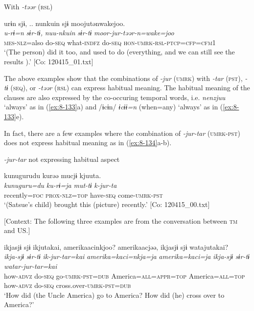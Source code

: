   With \textit{-təər} (\textsc{rsl})

\ex
{\TM}
\glll  urɨn  sjɨ, ..  nunkuin  sjɨ      moojutənwakejoo.\\
\textit{u-rɨ=n}  \textit{sɨr-tɨ,}  \textit{nuu-nkuin}  \textit{sɨr-tɨ}    \textit{moor-jur-təər-n=wake=joo}\\
\textsc{mes}-\textsc{nlz}=also  do-\textsc{seq}  what-\textsc{indfz}  do-\textsc{seq}  \textsc{hon}-\textsc{umrk}-\textsc{rsl}-\textsc{ptcp}=\textsc{cfp}=\textsc{cfm1}\\
\glt ‘(The person) did it too, and used to do (everything, and we can still see the results ).’ [Co: 120415\_01.txt]
\z
\z

The above examples show that the combinations of \textit{-jur} (\textsc{umrk}) with \textit{-tar} (\textsc{pst}), \textit{-tɨ} (\textsc{seq}), or \textit{-təər} (\textsc{rsl}) can express habitual meaning. The habitual meaning of the clauses are also expressed by the co-occuring temporal words, i.e. \textit{nenzjuu} ‘always’ as in (\ref{ex:8-133}a) and /ɨcɨn/ \textit{ɨcɨɨ=n} (when=any) ‘always’ as in (\ref{ex:8-133}e).

  In fact, there are a few examples where the combination of \textit{-jur-tar} (\textsc{umrk}-\textsc{pst}) does not express habitual meaning as in (\ref{ex:8-134}a-b).

\ea\label{ex:8-134}
  \textit{-jur-tar} not expressing habitual aspect

\ea
{\TM}
\glll  kunugurudu  kurəə  mucjɨ  kjuuta.\\
\textit{kunuguru=du}  \textit{ku-rɨ=ja}  \textit{mut-tɨ}  \textit{k-jur-ta}\\
recently=\textsc{foc}  \textsc{prox}-\textsc{nlz}=\textsc{top}  have-\textsc{seq}  come-\textsc{umrk}-\textsc{pst}\\
\glt ‘(Satsue’s child) brought this (picture) recently.’ [Co: 120415\_00.txt]

\ex {}[Context: The following three examples are from the conversation between \textsc{tm} and US.]

{\TM}
\glll  ikjasjɨ  sjɨ  ikjutakai,  amerikaacinkjoo?    amerikaacjəə,  ikjasjɨ  sjɨ  watajutakai?
\\
\textit{ikja-sjɨ}  \textit{sɨr-tɨ}  \textit{ik-jur-tar=kai}  \textit{amerika=kaci=nkja=ja}    \textit{amerika=kaci=ja}  \textit{ikja-sjɨ}  \textit{sɨr-tɨ}  \textit{watar-jur-tar=kai}\\
how-\textsc{advz}  do-\textsc{seq}  go-\textsc{umrk}-\textsc{pst}=\textsc{dub}  America=\textsc{all}=\textsc{appr}=\textsc{top}  America=\textsc{all}=\textsc{top}  how-\textsc{advz}  do-\textsc{seq}  cross.over-\textsc{umrk}-\textsc{pst}=\textsc{dub}\\
\glt ‘How did (the Uncle America) go to America? How did (he) cross over to America?’

